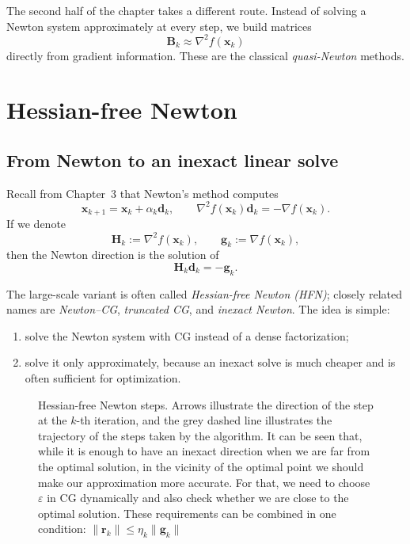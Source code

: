 The second half of the chapter takes a different route. Instead of solving a
Newton system approximately at every step, we build matrices
\[
  \mathbf{B}_k \approx \nabla^2 f(\mathbf{x}_k)
\]
directly from gradient information. These are the classical
\emph{quasi-Newton} methods.

\section{Hessian-free Newton}
\label{sec:ch6-hfn}

\subsection{From Newton to an inexact linear solve}
Recall from Chapter~3 that Newton's method computes
\[
  \mathbf{x}_{k+1}=\mathbf{x}_k+\alpha_k \mathbf{d}_k,
  \qquad
  \nabla^2 f(\mathbf{x}_k)\mathbf{d}_k=-\nabla f(\mathbf{x}_k).
\]
If we denote
\[
  \mathbf{H}_k:=\nabla^2 f(\mathbf{x}_k),
  \qquad
  \mathbf{g}_k:=\nabla f(\mathbf{x}_k),
\]
then the Newton direction is the solution of
\[
  \mathbf{H}_k \mathbf{d}_k=-\mathbf{g}_k.
\]

The large-scale variant is often called
\emph{Hessian-free Newton (HFN)}; closely related names are
\emph{Newton--CG}, \emph{truncated CG}, and \emph{inexact Newton}. The idea is
simple:
\begin{enumerate}
  \item solve the Newton system with CG instead of a dense factorization;
  \item solve it only approximately, because an inexact solve is much cheaper
  and is often sufficient for optimization.
\end{enumerate}

\begin{figure}[ht]
    \centering
    \caption{Hessian-free Newton steps. Arrows illustrate the direction
    of the step at the $k$-th iteration, and the grey dashed line illustrates
    the trajectory of the steps taken by the algorithm. It can be seen that,
    while it is enough to have an inexact direction when we are far from the
    optimal solution, in the vicinity of the optimal point we should make our
    approximation more accurate. For that, we need to choose $\varepsilon$ in
    CG dynamically and also check whether we are close to the optimal solution.
    These requirements can be combined in one condition:
  $\|\mathbf{r}_k \|\le \eta_k \| \mathbf{g}_k \|$}
    \label{fig:ch6-cg-newton-steps}
\end{figure}

